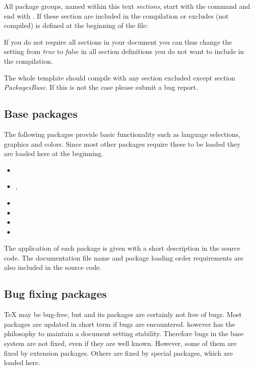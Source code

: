 All package groups, named within this text \emph{sections}, start with the command  and end with . If these section are included in the compilation or excludes (not compiled) is defined at the beginning of the file:


If you do not require all sections in your document you can thus change the setting from \emph{true} to \emph{false} in all section definitions you do not want to include in the compilation.

The whole template should compile with any section excluded except section \emph{PackagesBase}. If this is not the case please submit a bug report.

\subsection{Base packages}
\label{sec:packages:base}
The following packages provide basic functionality such as language selections, graphics and colors. Since most other packages require these to be loaded they are loaded here at the beginning. 

\begin{itemize}[noitemsep]
\item {}
\item {}, 
\item {}
\item {}
\item {}
\item {}
\end{itemize}

The application of each package is given with a short description in the source code. The documentation file name and package loading order requirements are also included in the source code. 


\subsection{Bug fixing packages}

\TeX{} may be bug-free, but \latex and its packages are certainly not free of bugs.  Most packages are updated in short term if bugs are encountered. \latex however has the philosophy to maintain a document setting stability. Therefore bugs in the base \latex system are not fixed, even if they are well known. However, some of them are fixed by extension packages. Others are fixed by special packages, which are loaded here.


